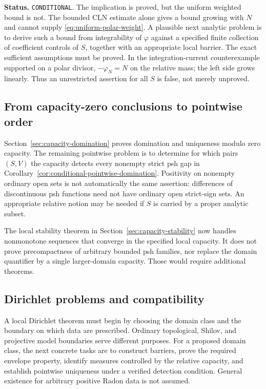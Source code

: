 \documentclass[11pt,a4paper]{article}
\numberwithin{equation}{section}
\theoremstyle{definition}
\theoremstyle{remark}
\begin{document}
\noindent\textbf{Status.} \texttt{CONDITIONAL}. The implication is
proved, but the uniform weighted bound is not. The bounded CLN estimate
alone gives a bound growing with $N$ and cannot supply
\eqref{eq:uniform-polar-weight}. A plausible next analytic problem is
to derive such a bound from integrability of $\varphi$ against a
specified finite collection of coefficient controls of $S$, together
with an appropriate local barrier. The exact sufficient assumptions
must be proved. In the integration-current counterexample supported
on a polar divisor, $-\varphi_N=N$ on the relative mass; the left
side grows linearly. Thus an unrestricted assertion for all $S$ is
false, not merely unproved.

\subsection{From capacity-zero conclusions to pointwise order}

Section~\ref{sec:capacity-domination} proves domination and uniqueness
modulo zero capacity. The remaining pointwise problem is to determine
for which pairs $(S,V)$ the capacity detects every nonempty strict
psh gap in Corollary~\ref{cor:conditional-pointwise-domination}.
Positivity on nonempty ordinary open sets is not automatically the
same assertion: differences of discontinuous psh functions need not
have ordinary open strict-sign sets. An appropriate relative notion
may be needed if $S$ is carried by a proper analytic subset.

The local stability theorem in Section~\ref{sec:capacity-stability}
now handles nonmonotone sequences that converge in the specified local
capacity. It does not prove precompactness of arbitrary bounded psh
families, nor replace the domain quantifier by a single larger-domain
capacity. Those would require additional theorems.

\subsection{Dirichlet problems and compatibility}

A local Dirichlet theorem must begin by choosing the domain class and
the boundary on which data are prescribed. Ordinary topological,
Shilov, and projective model boundaries serve different purposes.
For a proposed domain class, the next concrete tasks are to construct
barriers, prove the required envelope property, identify measures
controlled by the relative capacity, and establish pointwise
uniqueness under a verified detection condition. General existence
for arbitrary positive Radon data is not assumed.
\end{document}
